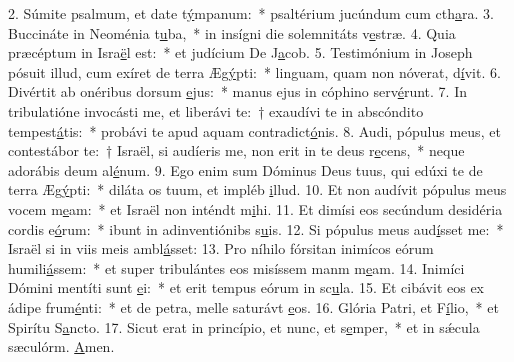 2. Súmite psalmum, et date t\uline{ý}mpanum:~* psaltérium jucúndum cum cth\uline{a}ra.
3. Buccináte in Neoménia t\uline{u}ba,~* in insígni die solemnitáts v\uline{e}stræ.
4. Quia præcéptum in Isra\uline{ë}l est:~* et judícium De J\uline{a}cob.
5. Testimónium in Joseph pósuit illud, cum exíret de terra Æg\uline{ý}pti:~* linguam, quam non nóverat, d\uline{í}vit.
6. Divértit ab onéribus dorsum \uline{e}jus:~* manus ejus in cóphino serv\uline{é}runt.
7. In tribulatióne invocásti me, et liberávi te:~† exaudívi te in abscóndito tempest\uline{á}tis:~* probávi te apud aquam contradict\uline{ó}nis.
8. Audi, pópulus meus, et contestábor te:~† Israël, si audíeris me, non erit in te deus r\uline{e}cens,~* neque adorábis deum al\uline{é}num.
9. Ego enim sum Dóminus Deus tuus, qui edúxi te de terra Æg\uline{ý}pti:~* diláta os tuum, et impléb \uline{i}llud.
10. Et non audívit pópulus meus vocem m\uline{e}am:~* et Israël non inténdt m\uline{i}hi.
11. Et dimísi eos secúndum desidéria cordis e\uline{ó}rum:~* ibunt in adinventiónibs s\uline{u}is.
12. Si pópulus meus aud\uline{í}sset me:~* Israël si in viis meis ambl\uline{á}sset:
13. Pro níhilo fórsitan inimícos eórum humili\uline{á}ssem:~* et super tribulántes eos misíssem manm m\uline{e}am.
14. Inimíci Dómini mentíti sunt \uline{e}i:~* et erit tempus eórum in sc\uline{u}la.
15. Et cibávit eos ex ádipe frum\uline{é}nti:~* et de petra, melle saturávt \uline{e}os.
16. Glória Patri, et F\uline{í}lio,~* et Spirítu S\uline{a}ncto.
17. Sicut erat in princípio, et nunc, et s\uline{e}mper,~* et in sǽcula sæculórm. \uline{A}men.
